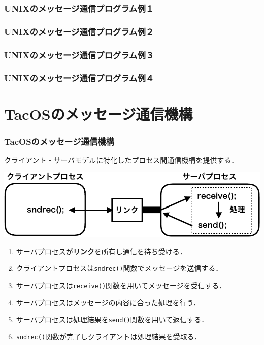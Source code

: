 \documentclass{beamer}                   %
\begin{document}
\begin{frame}
  \frametitle{UNIXのメッセージ通信プログラム例１}
  
  
\end{frame}

\begin{frame}
  \frametitle{UNIXのメッセージ通信プログラム例２}
  
\end{frame}

\begin{frame}
  \frametitle{UNIXのメッセージ通信プログラム例３}
  
\end{frame}

\begin{frame}
  \frametitle{UNIXのメッセージ通信プログラム例４}
  
  
\end{frame}

\section{TacOSのメッセージ通信機構}
\begin{frame}
  \frametitle{TacOSのメッセージ通信機構}
  クライアント・サーバモデルに特化したプロセス間通信機構を提供する．
  \begin{center}
    \includegraphics[scale=0.6]{Fig/tacosMessage-crop.pdf}
  \end{center}
  \begin{enumerate}
  \item サーバプロセスが{\bf リンク}を所有し通信を待ち受ける．
  \item クライアントプロセスは{\tt sndrec()}関数でメッセージを送信する．
  \item サーバプロセスは{\tt receive()}関数を用いてメッセージを受信する．
  \item サーバプロセスはメッセージの内容に合った処理を行う．
  \item サーバプロセスは処理結果を{\tt send()}関数を用いて返信する．
  \item {\tt sndrec()}関数が完了しクライアントは処理結果を受取る．
  \end{enumerate}
\end{frame}
\end{document}
